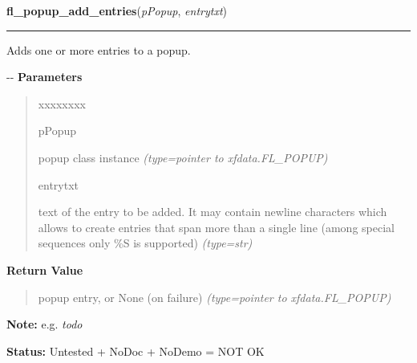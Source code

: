     \label{xformslib:flpopup:fl_popup_add_entries}

    \vspace{0.5ex}

\hspace{.8\funcindent}\begin{boxedminipage}{\funcwidth}

    \raggedright \textbf{fl\_popup\_add\_entries}(\textit{pPopup}, \textit{entrytxt})

    \vspace{-1.5ex}

    \rule{\textwidth}{0.5\fboxrule}
\setlength{\parskip}{2ex}

Adds one or more entries to a popup.

-{}-
\setlength{\parskip}{1ex}
      \textbf{Parameters}
      \vspace{-1ex}

      \begin{quote}
        \begin{Ventry}{xxxxxxxx}

          \item[pPopup]


popup class instance
            {\it (type=pointer to xfdata.FL\_POPUP)}

          \item[entrytxt]


text of the entry to be added. It may contain newline characters which
allows to create entries that span more than a single line (among
special sequences only \%S is supported)
            {\it (type=str)}

        \end{Ventry}

      \end{quote}

      \textbf{Return Value}
    \vspace{-1ex}

      \begin{quote}

popup entry, or None (on failure)
      {\it (type=pointer to xfdata.FL\_POPUP)}

      \end{quote}

\textbf{Note:} 
e.g. \emph{todo}


\textbf{Status:} 
Untested + NoDoc + NoDemo = NOT OK


    \end{boxedminipage}


